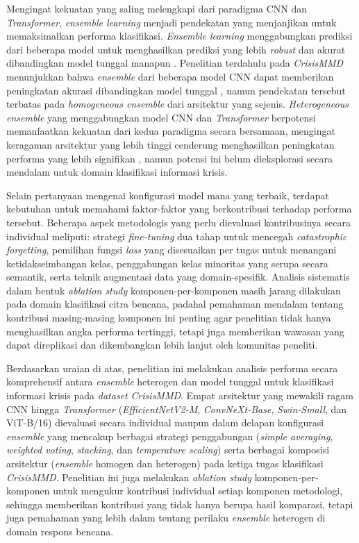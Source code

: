 Mengingat kekuatan yang saling melengkapi dari paradigma CNN dan
\textit{Transformer}, \textit{ensemble learning} menjadi pendekatan yang
menjanjikan untuk memaksimalkan performa klasifikasi. \textit{Ensemble
learning} menggabungkan prediksi dari beberapa model untuk menghasilkan
prediksi yang lebih \textit{robust} dan akurat dibandingkan model
tunggal manapun \cite{rokach2010ensemble}. Penelitian terdahulu pada
\textit{CrisisMMD} menunjukkan bahwa \textit{ensemble} dari beberapa
model CNN dapat memberikan peningkatan akurasi dibandingkan model
tunggal \cite{firmansyah2022ensemble}, namun pendekatan tersebut
terbatas pada \textit{homogeneous ensemble} dari arsitektur yang
sejenis. \textit{Heterogeneous ensemble} yang menggabungkan model CNN
dan \textit{Transformer} berpotensi memanfaatkan kekuatan dari kedua
paradigma secara bersamaan, mengingat keragaman arsitektur yang lebih
tinggi cenderung menghasilkan peningkatan performa yang lebih signifikan
\cite{ganaie2022ensemble}, namun potensi ini belum dieksplorasi secara
mendalam untuk domain klasifikasi informasi krisis. \par

Selain pertanyaan mengenai konfigurasi model mana yang terbaik,
terdapat kebutuhan untuk memahami faktor-faktor yang berkontribusi
terhadap performa tersebut. Beberapa aspek metodologis yang perlu
dievaluasi kontribusinya secara individual meliputi: strategi
\textit{fine-tuning} dua tahap untuk mencegah \textit{catastrophic
forgetting}, pemilihan fungsi \textit{loss} yang disesuaikan per tugas
untuk menangani ketidakseimbangan kelas, penggabungan kelas minoritas
yang serupa secara semantik, serta teknik augmentasi data yang
domain-spesifik. Analisis sistematis dalam bentuk \textit{ablation
study} komponen-per-komponen masih jarang dilakukan pada domain
klasifikasi citra bencana, padahal pemahaman mendalam tentang kontribusi
masing-masing komponen ini penting agar penelitian tidak hanya
menghasilkan angka performa tertinggi, tetapi juga memberikan wawasan
yang dapat direplikasi dan dikembangkan lebih lanjut oleh komunitas
peneliti. \par

Berdasarkan uraian di atas, penelitian ini melakukan analisis performa
secara komprehensif antara \textit{ensemble} heterogen dan model tunggal
untuk klasifikasi informasi krisis pada \textit{dataset}
\textit{CrisisMMD}. Empat arsitektur yang mewakili ragam CNN hingga
\textit{Transformer} (\textit{EfficientNetV2-M}, \textit{ConvNeXt-Base},
\textit{Swin-Small}, dan ViT-B/16) dievaluasi secara individual maupun
dalam delapan konfigurasi \textit{ensemble} yang mencakup berbagai
strategi penggabungan (\textit{simple averaging}, \textit{weighted
voting}, \textit{stacking}, dan \textit{temperature scaling}) serta
berbagai komposisi arsitektur (\textit{ensemble} homogen dan heterogen)
pada ketiga tugas klasifikasi \textit{CrisisMMD}. Penelitian ini juga
melakukan \textit{ablation study} komponen-per-komponen untuk mengukur
kontribusi individual setiap komponen metodologi, sehingga memberikan
kontribusi yang tidak hanya berupa hasil komparasi, tetapi juga
pemahaman yang lebih dalam tentang perilaku \textit{ensemble} heterogen
di domain respons bencana. \par


